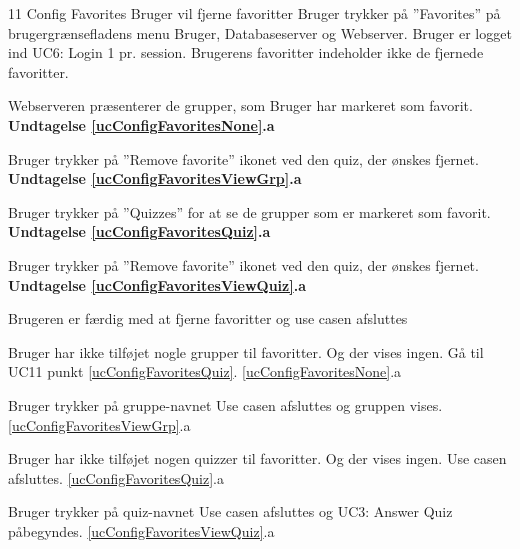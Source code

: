
\uchead
	{11}
	{Config Favorites}
	{Bruger vil fjerne favoritter}
	{Bruger trykker på ''Favorites'' på brugergrænsefladens menu}
	{Bruger, Databaseserver og Webserver.}
	{Bruger er logget ind}
	{UC6: Login}
	{1 pr. session.}
	{Brugerens favoritter indeholder ikke de fjernede favoritter.}

\item \label{ucConfigFavoritesNone} Webserveren præsenterer de  grupper, som Bruger har markeret som favorit.
\textbf{Undtagelse \ref{ucConfigFavoritesNone}.a}

\item \label{ucConfigFavoritesViewGrp}Bruger trykker på ''Remove favorite'' ikonet ved den quiz, der ønskes fjernet.
\textbf{Undtagelse \ref{ucConfigFavoritesViewGrp}.a}

\item \label{ucConfigFavoritesQuiz}Bruger trykker på ''Quizzes'' for at se de grupper som er markeret som favorit.
\textbf{Undtagelse \ref{ucConfigFavoritesQuiz}.a}

\item \label{ucConfigFavoritesViewQuiz}Bruger trykker på ''Remove favorite'' ikonet ved den quiz, der ønskes fjernet.
\textbf{Undtagelse \ref{ucConfigFavoritesViewQuiz}.a}

\item Brugeren er færdig med at fjerne favoritter og use casen afsluttes

\ucdescriptionend

\ucextension
	{Bruger har ikke tilføjet nogle grupper til favoritter. Og der vises ingen.}
	{Gå til UC11 punkt \ref{ucConfigFavoritesQuiz}.}
	{\ref{ucConfigFavoritesNone}.a}
		
\ucextension
	{Bruger trykker på gruppe-navnet}
	{Use casen afsluttes og gruppen vises.}
	{\ref{ucConfigFavoritesViewGrp}.a}		
		
\ucextension
			{Bruger har ikke tilføjet nogen quizzer til favoritter. Og der vises ingen.}
	{Use casen afsluttes.}
	{\ref{ucConfigFavoritesQuiz}.a}
	
\ucextension
	{Bruger trykker på quiz-navnet}
	{Use casen afsluttes og UC3: Answer Quiz påbegyndes.}
	{\ref{ucConfigFavoritesViewQuiz}.a}
		

